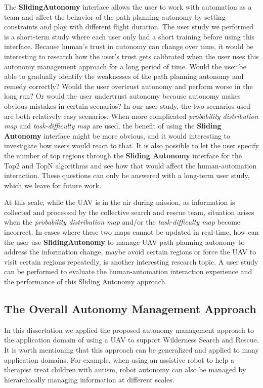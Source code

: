 The \textbf{SlidingAutonomy} interface allows the user to work with automation as a team and affect the behavior of the path planning autonomy by setting constraints and play with different flight duration. The user study we performed is a short-term study where each user only had a short training before using this interface. Because human's trust in autonomy can change over time, it would be interesting to research how the user's trust gets calibrated when the user uses this autonomy management approach for a long period of time. Would the user be able to gradually identify the weaknesses of the path planning autonomy and remedy correctly? Would the user overtrust autonomy and perform worse in the long run? Or would the user undertrust autonomy because autonomy makes obvious mistakes in certain scenarios? In our user study, the two scenarios used are both relatively easy scenarios. When more complicated \textit{probability distribution map} and \textit{task-difficulty map} are used, the benefit of using the \textbf{Sliding Autonomy} interface might be more obvious, and it would interesting to investigate how users would react to that. It is also possible to let the user specify the number of top regions through the \textbf{Sliding Autonomy} interface for the Top2 and TopN algorithms and see how that would affect the human-automation interaction. These questions can only be answered with a long-term user study, which we leave for future work.

At this scale, while the UAV is in the air during mission, as information is collected and processed by the collective search and rescue team, situation arises when the \textit{probability distribution map} and/or the \textit{task-difficulty map} become incorrect. In cases where these two maps cannot be updated in real-time, how can the user use \textbf{SlidingAutonomy} to manage UAV path planning autonomy to address the information change, maybe avoid certain regions or force the UAV to visit certain regions repeatedly, is another interesting research topic. A user study can be performed to evaluate the human-automation interaction experience and the performance of this Sliding Autonomy approach.


\subsection{The Overall Autonomy Management Approach}

In this dissertation we applied the proposed autonomy management approach to the application domain of using a UAV to support Wilderness Search and Rescue. It is worth mentioning that this approach can be generalized and applied to many application domains. For example, when using an assistive robot to help a therapist treat children with autism, robot autonomy can also be managed by hierarchically managing information at different scales. 

